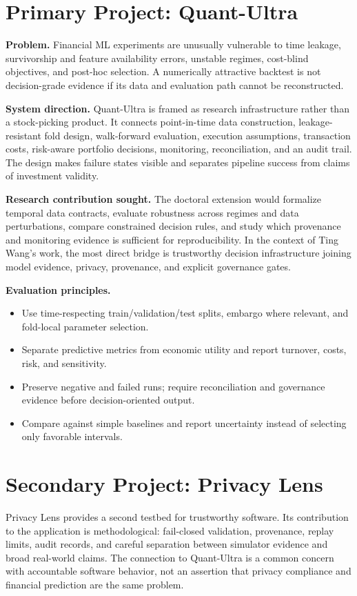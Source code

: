 \documentclass[11pt]{article}
\begin{document}
\section*{Primary Project: Quant-Ultra}
\textbf{Problem.} Financial ML experiments are unusually vulnerable to time leakage, survivorship and feature availability errors, unstable regimes, cost-blind objectives, and post-hoc selection. A numerically attractive backtest is not decision-grade evidence if its data and evaluation path cannot be reconstructed.

\textbf{System direction.} Quant-Ultra is framed as research infrastructure rather than a stock-picking product. It connects point-in-time data construction, leakage-resistant fold design, walk-forward evaluation, execution assumptions, transaction costs, risk-aware portfolio decisions, monitoring, reconciliation, and an audit trail. The design makes failure states visible and separates pipeline success from claims of investment validity.

\textbf{Research contribution sought.} The doctoral extension would formalize temporal data contracts, evaluate robustness across regimes and data perturbations, compare constrained decision rules, and study which provenance and monitoring evidence is sufficient for reproducibility. In the context of Ting Wang's work, the most direct bridge is trustworthy decision infrastructure joining model evidence, privacy, provenance, and explicit governance gates.

\textbf{Evaluation principles.}
\begin{itemize}
\item Use time-respecting train/validation/test splits, embargo where relevant, and fold-local parameter selection.
\item Separate predictive metrics from economic utility and report turnover, costs, risk, and sensitivity.
\item Preserve negative and failed runs; require reconciliation and governance evidence before decision-oriented output.
\item Compare against simple baselines and report uncertainty instead of selecting only favorable intervals.
\end{itemize}

\section*{Secondary Project: Privacy Lens}
Privacy Lens provides a second testbed for trustworthy software. Its contribution to the application is methodological: fail-closed validation, provenance, replay limits, audit records, and careful separation between simulator evidence and broad real-world claims. The connection to Quant-Ultra is a common concern with accountable software behavior, not an assertion that privacy compliance and financial prediction are the same problem.
\end{document}
